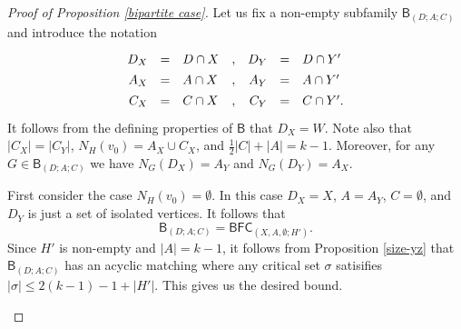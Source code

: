 \documentclass[10pt]{amsart}
\theoremstyle{definition}
\begin{document}
\begin{proof}[Proof of Proposition \ref{bipartite case}]
		Let us fix a non-empty subfamily $\mathsf{B}_{(D; A; C)}$ and introduce the notation
		\[\def\arraystretch{1.35}
		\begin{array}{rclcrcl}
		D_X & = & D\cap X   &, &    D_Y & = & D\cap Y' \\
		A_X & = & A\cap X   &, &    A_Y & = & A\cap Y' \\
		C_X & = & C\cap X   &, &    C_Y & = & C\cap Y' .\\
		\end{array}
		\]
		It follows from the defining properties of $\mathsf{B}$ that $D_X = W$. Note also that $|C_X| = |C_Y|$,  $N_H(v_0) = A_X\cup C_X$, and $\frac{1}{2}|C|+|A| = k-1$. Moreover, for any $G\in \mathsf{B}_{(D; A; C)}$ we have $N_G(D_X) = A_Y$ and $N_G(D_Y) = A_X$.
		
		\medskip
		
		First consider the case $N_H(v_0) = \emptyset$. In this case $D_X=X$, $A = A_Y$, $C = \emptyset$,  and $D_Y$ is just a set of isolated vertices. It follows that  
		\[\mathsf{B}_{(D;A;C)} = \mathsf{BFC}_{(X, A, \emptyset; H')}.\]
		Since $H'$ is non-empty and $|A| = k-1$, it follows from Proposition \ref{size-yz} that $\mathsf{B}_{(D; A; C)}$ has an acyclic matching where any critical set $\sigma$ satisifies $|\sigma| \leq 2(k-1) - 1 + |H'|$. This gives us the desired bound. 
		
		\medskip
		\begin{figure} 
			\centering
\end{figure}
\end{proof}
\end{document}
